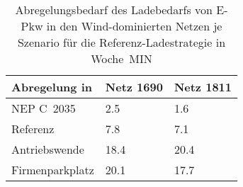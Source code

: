 {
\renewcommand{\arraystretch}{1.2}%
\begin{table}[H]
	\begin{center}
		\caption{Abregelungsbedarf des Ladebedarfs von E-Pkw in den Wind-dominierten Netzen je Szenario für die Referenz-Ladestrategie in Woche~MIN}
		\begin{tabu} to 0.6\textwidth {X[1.5] X[1, r] X[1, r]}
			\toprule
			Abregelung in   \si{\mwh}    & Netz \num{1690} & Netz \num{1811} \\ \midrule
			NEP C~\num{2035}             & \num{2.5}       & \num{1.6}       \\
			Referenz                     & \num{7.8}       & \num{7.1}       \\
			Antriebswende                & \num{18.4}      & \num{20.4}      \\
			\glqq Firmenparkplatz\grqq{} & \num{20.1}      & \num{17.7}      \\ \bottomrule
		\end{tabu}
		\label{tab:wind_dominated_week_a_epkw_cur}
	\end{center}
	\vspace{-3mm}%
\end{table}
}